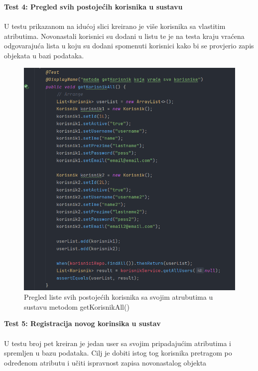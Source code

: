		\pagebreak 
		
		\textbf{Test 4: Pregled svih postojećih korisnika u sustavu}\\
			\\ U testu prikazanom na idućoj slici kreirano je više korisnika sa vlastitim atributima. Novonastali korisnici su dodani u listu te je na testa kraju vraćena odgovarajuća lista u koju su dodani spomenuti korisnici kako bi se provjerio zapis objekata u bazi podataka.
			
			\begin{figure}[H]
			\includegraphics[scale=0.6]{slike/allUsers.PNG} %
			\centering
			\caption{Pregled liste svih postojećih korisnika sa svojim atrubutima u sustavu metodom getKorisnikAll()}
			\label{fig:implementacija}
		\end{figure}
		
		\textbf{Test 5: Registracija novog korinsika u sustav}\\
			\\ U testu broj pet kreiran je jedan user sa svojim pripadajućim atributima i spremljen u bazu podataka. Cilj je dobiti istog tog korisnika pretragom po određenom atributu i učiti ispravnost zapisa novonastalog objekta
			
